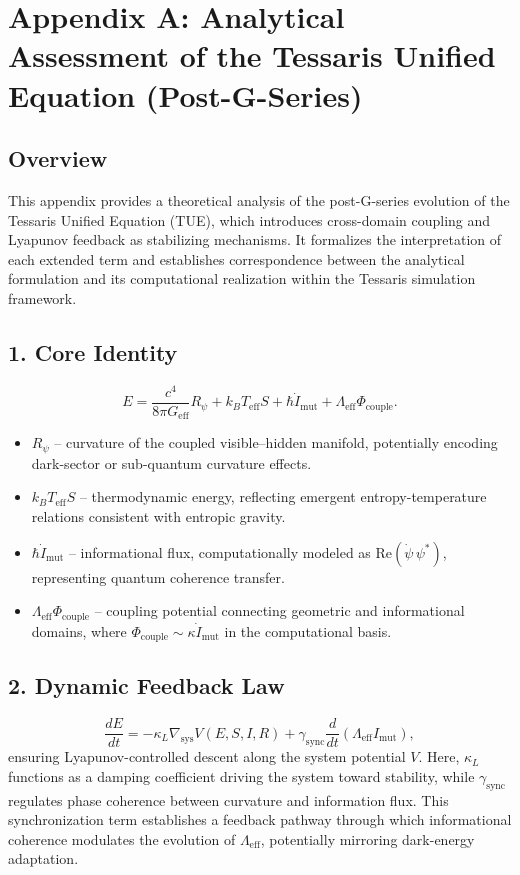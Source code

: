 \appendix
\section*{Appendix A: Analytical Assessment of the Tessaris Unified Equation (Post-G-Series)}

\subsection*{Overview}
This appendix provides a theoretical analysis of the post-G-series evolution of the Tessaris Unified Equation (TUE), which introduces cross-domain coupling and Lyapunov feedback as stabilizing mechanisms.  
It formalizes the interpretation of each extended term and establishes correspondence between the analytical formulation and its computational realization within the Tessaris simulation framework.

\subsection*{1. Core Identity}
\begin{equation}
E = \frac{c^4}{8 \pi G_{\text{eff}}} R_{\psi}
  + k_B T_{\text{eff}} S
  + \hbar \dot{I}_{\text{mut}}
  + \Lambda_{\text{eff}} \Phi_{\text{couple}} .
\end{equation}
\begin{itemize}
  \item $R_{\psi}$ – curvature of the coupled visible–hidden manifold, potentially encoding dark-sector or sub-quantum curvature effects.  
  \item $k_B T_{\text{eff}} S$ – thermodynamic energy, reflecting emergent entropy-temperature relations consistent with entropic gravity.  
  \item $\hbar \dot{I}_{\text{mut}}$ – informational flux, computationally modeled as $\mathrm{Re}(\dot{\psi}\,\psi^*)$, representing quantum coherence transfer.  
  \item $\Lambda_{\text{eff}} \Phi_{\text{couple}}$ – coupling potential connecting geometric and informational domains, where $\Phi_{\text{couple}}\!\sim\!\kappa\dot{I}_{\text{mut}}$ in the computational basis.
\end{itemize}

\subsection*{2. Dynamic Feedback Law}
\begin{equation}
\frac{dE}{dt} = -\kappa_L\nabla_{\text{sys}}V(E,S,I,R)
  + \gamma_{\text{sync}}\frac{d}{dt}(\Lambda_{\text{eff}}I_{\text{mut}}),
\end{equation}
ensuring Lyapunov-controlled descent along the system potential $V$.  
Here, $\kappa_L$ functions as a damping coefficient driving the system toward stability, while $\gamma_{\text{sync}}$ regulates phase coherence between curvature and information flux.  
This synchronization term establishes a feedback pathway through which informational coherence modulates the evolution of $\Lambda_{\text{eff}}$, potentially mirroring dark-energy adaptation.

